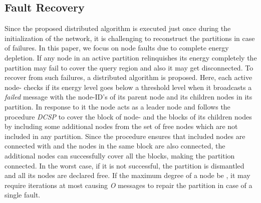 \documentclass{acm_proc_article-sp}
\begin{document}
\subsection{Fault Recovery}
Since the proposed distributed algorithm is executed just once during the initialization of the network, it is challenging to reconstruct the partitions in case of failures. In this paper, we focus on node faults due to complete energy depletion. If any node in an active partition relinquishes its energy completely the partition may fail to cover the query region and also it may get disconnected. To recover from such failures, a distributed algorithm is proposed. Here, each active node- checks if its energy level goes below a threshold level when it broadcasts a {\it failed} message with the node-ID's of its parent node  and its children nodes in its partition. In response to it the node  acts as a leader node and follows the procedure {\it DCSP} to cover the block of node- and the blocks of its children nodes by including some additional nodes from the set of free nodes which are not included in any partition.
Since the procedure ensures that included nodes are connected with  and the nodes in the same block are also connected, the additional nodes can successfully cover all the blocks, making the partition connected. In the worst case, if it is not successful, the partition is dismantled and all its nodes are declared free. If the maximum degree of a node be , it may require  iterations at most causing {\it O} messages to repair the partition in case of a single fault.
\end{document}
